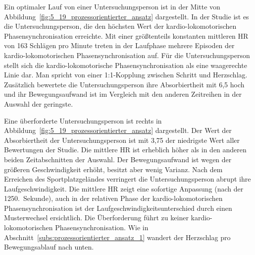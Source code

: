 \begin{sidewaysfigure}
	\resizebox{1.00\textwidth}{!}{%
		
		}%
	\caption[Prozessdarstellung im Verlauf des Laufess (Studie: Laufen)]{Prozessdarstellung im Verlauf des Laufens -- Drei Minuten Daten einer Untersuchungsperson, die sich unterfordert hat (links), einer Untersuchungsperson, die ihr optimales Tempo gefunden hat (mitte) und einer Untersuchungsperson, die sich überfordert hat (rechts). Quelle: Eigene Darstellung \\ \hspace{\textwidth}\emph{Anmerkung}: Bew. = Bewegungsaufwand \\ \hspace{\textwidth}Rel. Phase = Relative Phase}
	\label{fig:5_19_prozessorientierter_ansatz}
\end{sidewaysfigure}

Ein optimaler Lauf von einer Untersuchungsperson ist in der Mitte von Abbildung~\ref{fig:5_19_prozessorientierter_ansatz} dargestellt. In der Studie ist es die Untersuchungsperson, die den höchsten Wert der kardio-lokomotorischen Phasensynchronisation erreichte. Mit einer größtenteils konstanten mittleren \ac{HR} von 163 Schlägen pro Minute treten in der Laufphase mehrere Episoden der kardio-lokomotorischen Phasensynchronisation auf. Für die Untersuchungsperson stellt sich die kardio-lokomotorische Phasensynchronisation als eine waagerechte Linie dar. Man spricht von einer 1:1-Kopplung zwischen Schritt und Herzschlag. Zusätzlich bewertete die Untersuchungsperson ihre Absorbiertheit mit 6,5 hoch und ihr Bewegungsaufwand ist im Vergleich mit den anderen Zeitreihen in der Auswahl der geringste. 

Eine überforderte Untersuchungsperson ist rechts in Abbildung~\ref{fig:5_19_prozessorientierter_ansatz} dargestellt. Der Wert der Absorbiertheit der Untersuchungsperson ist mit 3,75 der niedrigste Wert aller Bewertungen der Studie. Die mittlere \ac{HR} ist erheblich höher als in den anderen beiden Zeitabschnitten der Auswahl. Der Bewegungsaufwand ist wegen der größeren Geschwindigkeit erhöht, besitzt aber wenig Varianz. Nach dem Erreichen des Sportplatzgeländes verringert die Untersuchungsperson abrupt ihre Laufgeschwindigkeit. Die mittlere \ac{HR} zeigt eine sofortige Anpassung (nach der 1250.~Sekunde), auch in der relativen Phase der kardio-lokomotorischen Phasensynchronisation ist der Laufgeschwindigkeitsunterschied durch einen Musterwechsel ersichtlich. Die Überforderung führt zu keiner kardio-lokomotorischen Phasensynchronisation. Wie in Abschnitt~\ref{subs:prozessorientierter_ansatz_1} wandert der Herzschlag pro Bewegungsablauf nach unten.

